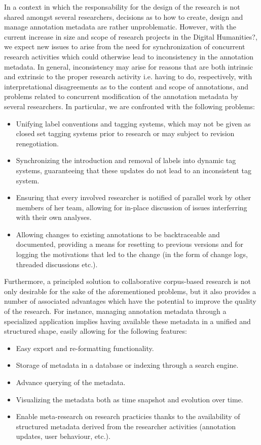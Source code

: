 \documentclass{sig-alternate}
\begin{document}
In a context in which the responsability for the design of the research is not shared
amongst several researchers, decisions as to how to create, design and manage annotation
metadata are rather unproblematic. However, with the current increase in size and scope of
research projects in the Digital Humanities?, we expect new issues to arise from the need
for synchronization of concurrent research activities which could otherwise lead to
inconsistency in the annotation metadata. In general, inconsistency may arise for reasons
that are both intrinsic and extrinsic to the proper research activity \textemdash i.e. having
to do, respectively, with interpretational disagreements as to the content and scope of
annotations, and problems related to concurrent modification of the annotation metadata
by several researchers. In particular, we are confronted with the following problems:
\begin{itemize}
\item Unifying label conventions and tagging systems, which may not be given as closed
  set tagging systems prior to research or may subject to revision renegotiation.
\item Synchronizing the introduction and removal of labels into dynamic tag systems,
  guaranteeing that these updates do not lead to an inconsistent tag system.
\item Ensuring that every involved researcher is notified of parallel work by other members
  of her team, allowing for in-place discussion of issues interferring with their own analyses.
\item Allowing changes to existing annotations to be backtraceable and documented, providing
  a means for resetting to previous versions and for logging the motivations
  that led to the change (in the form of change logs, threaded discussions etc.).
\end{itemize}

Furthermore, a principled solution to collaborative corpus-based research is not only
desirable for the sake of the aforementioned problems, but it also provides a number of
associated advantages which have the potential to improve the quality of the research.
For instance, managing annotation metadata through a specialized application implies
having available these metadata in a unified and structured shape, easily allowing
for the following features:

\begin{itemize}
\item Easy export and re-formatting functionality.
\item Storage of metadata in a database or indexing through a search engine.
\item Advance querying of the metadata.
\item Visualizing the metadata both as time snapshot and evolution over time.
\item Enable meta-research on research practicies thanks to the availability of structured
  metadata derived from the researcher activities (annotation updates, user behaviour, etc.).
\end{itemize}
\end{document}
